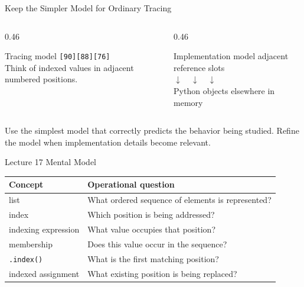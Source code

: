 \documentclass[aspectratio=169,10pt]{beamer}
\begin{document}
\begin{frame}{Keep the Simpler Model for Ordinary Tracing}
  \begin{columns}[T,onlytextwidth]
    \begin{column}{0.46\textwidth}
      \begin{block}{Tracing model}
        \texttt{[90][88][76]}\\[0.10in]
        Think of indexed values in adjacent numbered positions.
      \end{block}
    \end{column}
    \begin{column}{0.46\textwidth}
      \begin{block}{Implementation model}
        adjacent reference slots\\[0.10in]
        $\downarrow\quad\downarrow\quad\downarrow$\\[-0.02in]
        Python objects elsewhere in memory
      \end{block}
    \end{column}
  \end{columns}

  \begin{keyidea}
    Use the simplest model that correctly predicts the behavior being studied. Refine the model when implementation details become relevant.
  \end{keyidea}
\end{frame}

\begin{frame}{Lecture 17 Mental Model}
  \begin{center}
    \renewcommand{\arraystretch}{1.45}
    \begin{tabular}{l|l}
      \textbf{Concept} & \textbf{Operational question} \\\hline
      list & What ordered sequence of elements is represented? \\
      index & Which position is being addressed? \\
      indexing expression & What value occupies that position? \\
      membership & Does this value occur in the sequence? \\
      \texttt{.index()} & What is the first matching position? \\
      indexed assignment & What existing position is being replaced?
    \end{tabular}
  \end{center}
\end{frame}
\end{document}
